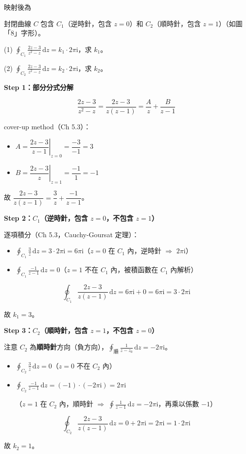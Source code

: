\documentclass[12pt,a4paper]{article}
\newcommand{\dd}{\,\mathrm{d}}
\newcommand{\ii}{\mathrm{i}}
\begin{document}
\begin{ansbox}
映射後為
\end{ansbox}

\begin{qbox}[第 12 題]
封閉曲線 $C$ 包含 $C_1$（逆時針，包含 $z=0$）和 $C_2$（順時針，包含 $z=1$）（如圖「8」字形）。

(1) $\displaystyle\oint_{C_1}\frac{2z-3}{z^2-z}\dd{z}=k_1\cdot 2\pi\ii$，求 $k_1$。

(2) $\displaystyle\oint_{C_2}\frac{2z-3}{z^2-z}\dd{z}=k_2\cdot 2\pi\ii$，求 $k_2$。
\end{qbox}

\begin{solbox}[解]
\textbf{Step 1：部分分式分解}

$$\frac{2z-3}{z^2-z}=\frac{2z-3}{z(z-1)}=\frac{A}{z}+\frac{B}{z-1}$$

cover-up method（Ch 5.3）：
\begin{itemize}
\item $A=\left.\dfrac{2z-3}{z-1}\right|_{z=0}=\dfrac{-3}{-1}=3$
\item $B=\left.\dfrac{2z-3}{z}\right|_{z=1}=\dfrac{-1}{1}=-1$
\end{itemize}

故 $\dfrac{2z-3}{z(z-1)}=\dfrac{3}{z}+\dfrac{-1}{z-1}$。

\textbf{Step 2：$C_1$（逆時針，包含 $z=0$，不包含 $z=1$）}

逐項積分（Ch 5.3，Cauchy-Goursat 定理）：
\begin{itemize}
\item $\displaystyle\oint_{C_1}\frac{3}{z}\dd{z}=3\cdot 2\pi\ii=6\pi\ii$（$z=0$ 在 $C_1$ 內，逆時針 $\Rightarrow$ $2\pi\ii$）
\item $\displaystyle\oint_{C_1}\frac{-1}{z-1}\dd{z}=0$（$z=1$ 不在 $C_1$ 內，被積函數在 $C_1$ 內解析）
\end{itemize}

$$\oint_{C_1}\frac{2z-3}{z(z-1)}\dd{z}=6\pi\ii+0=6\pi\ii=3\cdot 2\pi\ii$$

故 $k_1=3$。

\textbf{Step 3：$C_2$（順時針，包含 $z=1$，不包含 $z=0$）}

注意 $C_2$ 為\textbf{順時針}方向（負方向），$\displaystyle\oint_{\text{順}}\frac{1}{z-z_0}\dd{z}=-2\pi\ii$。

\begin{itemize}
\item $\displaystyle\oint_{C_2}\frac{3}{z}\dd{z}=0$（$z=0$ 不在 $C_2$ 內）
\item $\displaystyle\oint_{C_2}\frac{-1}{z-1}\dd{z}=(-1)\cdot(-2\pi\ii)=2\pi\ii$

（$z=1$ 在 $C_2$ 內，順時針 $\Rightarrow$ $\oint\frac{1}{z-1}\dd{z}=-2\pi\ii$，再乘以係數 $-1$）
\end{itemize}

$$\oint_{C_2}\frac{2z-3}{z(z-1)}\dd{z}=0+2\pi\ii=2\pi\ii=1\cdot 2\pi\ii$$

故 $k_2=1$。
\end{solbox}
\end{document}
